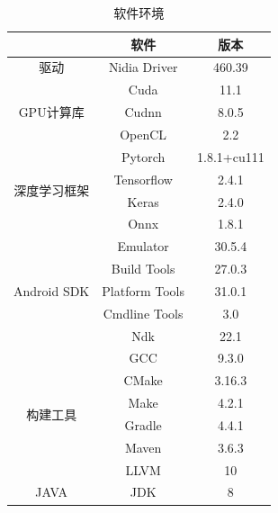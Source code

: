 \begin{table}[h!]
    \centering
    \caption{软件环境}
    \label{platform_software}
    \begin{tabular}{c|c|c}
    \hline
                                 & 软件             & 版本          \\ \hline
    驱动                          & Nidia Driver   & 460.39      \\ \hline
    \multirow{3}{*}{GPU计算库}      & Cuda           & 11.1        \\ \cline{2-3} 
                                 & Cudnn          & 8.0.5       \\ \cline{2-3} 
                                 & OpenCL         & 2.2         \\ \hline
    \multirow{4}{*}{深度学习框架}      & Pytorch        & 1.8.1+cu111 \\ \cline{2-3} 
                                 & Tensorflow     & 2.4.1       \\ \cline{2-3} 
                                 & Keras          & 2.4.0       \\ \cline{2-3} 
                                 & Onnx           & 1.8.1       \\ \hline
    \multirow{5}{*}{Android SDK} & Emulator       & 30.5.4      \\ \cline{2-3} 
                                 & Build Tools    & 27.0.3      \\ \cline{2-3} 
                                 & Platform Tools & 31.0.1      \\ \cline{2-3} 
                                 & Cmdline Tools  & 3.0         \\ \cline{2-3} 
                                 & Ndk            & 22.1        \\ \hline
    \multirow{6}{*}{构建工具}        & GCC            & 9.3.0       \\ \cline{2-3} 
                                 & CMake          & 3.16.3      \\ \cline{2-3} 
                                 & Make           & 4.2.1       \\ \cline{2-3} 
                                 & Gradle         & 4.4.1       \\ \cline{2-3} 
                                 & Maven          & 3.6.3       \\ \cline{2-3} 
                                 & LLVM           & 10          \\ \hline
    JAVA                         & JDK            & 8           \\ \hline
    \end{tabular}
\end{table}

